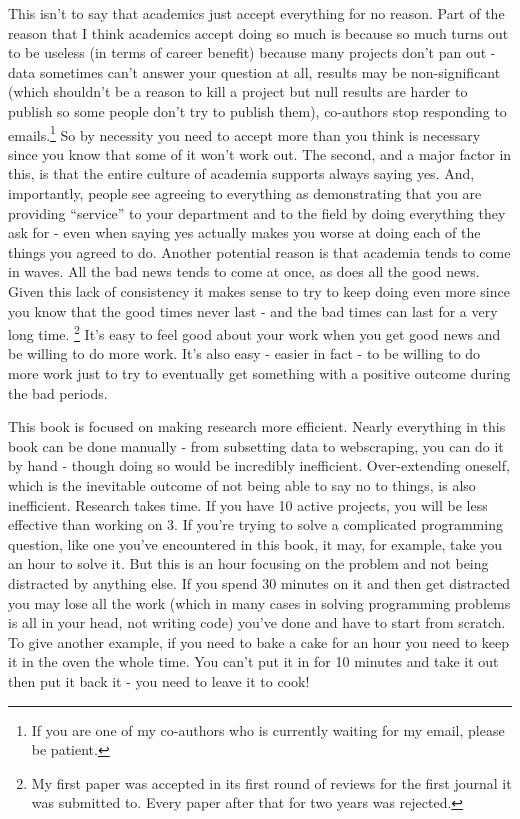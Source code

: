 \documentclass[
  12pt,
  openany]{book}
\begin{document}
This isn't to say that academics just accept everything for no reason. Part of the reason that I think academics accept doing so much is because so much turns out to be useless (in terms of career benefit) because many projects don't pan out - data sometimes can't answer your question at all, results may be non-significant (which shouldn't be a reason to kill a project but null results are harder to publish so some people don't try to publish them), co-authors stop responding to emails.\footnote{If you are one of my co-authors who is currently waiting for my email, please be patient.} So by necessity you need to accept more than you think is necessary since you know that some of it won't work out. The second, and a major factor in this, is that the entire culture of academia supports always saying yes. And, importantly, people see agreeing to everything as demonstrating that you are providing ``service'' to your department and to the field by doing everything they ask for - even when saying yes actually makes you worse at doing each of the things you agreed to do. Another potential reason is that academia tends to come in waves. All the bad news tends to come at once, as does all the good news. Given this lack of consistency it makes sense to try to keep doing even more since you know that the good times never last - and the bad times can last for a very long time. \footnote{My first paper was accepted in its first round of reviews for the first journal it was submitted to. Every paper after that for two years was rejected.} It's easy to feel good about your work when you get good news and be willing to do more work. It's also easy - easier in fact - to be willing to do more work just to try to eventually get something with a positive outcome during the bad periods.

This book is focused on making research more efficient. Nearly everything in this book can be done manually - from subsetting data to webscraping, you can do it by hand - though doing so would be incredibly inefficient. Over-extending oneself, which is the inevitable outcome of not being able to say no to things, is also inefficient. Research takes time. If you have 10 active projects, you will be less effective than working on 3. If you're trying to solve a complicated programming question, like one you've encountered in this book, it may, for example, take you an hour to solve it. But this is an hour focusing on the problem and not being distracted by anything else. If you spend 30 minutes on it and then get distracted you may lose all the work (which in many cases in solving programming problems is all in your head, not writing code) you've done and have to start from scratch. To give another example, if you need to bake a cake for an hour you need to keep it in the oven the whole time. You can't put it in for 10 minutes and take it out then put it back it - you need to leave it to cook!
\end{document}
